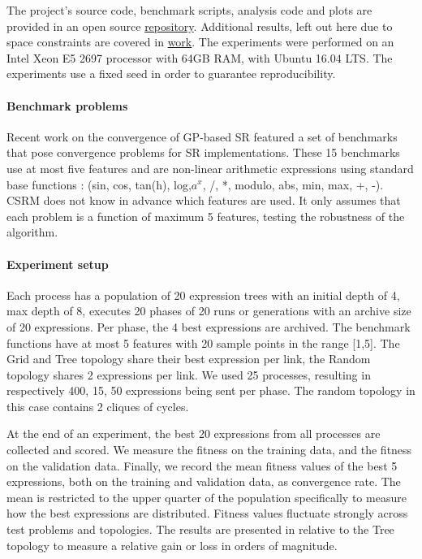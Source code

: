 
The project's source code, benchmark scripts, analysis code and plots are provided in an open source  \href{https://bitbucket.org/bcardoen/csrm}{repository}. Additional results, left out here due to space constraints are covered in \href{https://bitbucket.org/bcardoen/csrm/src/9de4b990ce27bbaeb885203f82a76635d8d92473/thesis/thesis/MsCThesisBenCardoen.pdf?at=master&fileviewer=file-view-default}{work}.
The experiments were performed on an Intel Xeon E5 2697 processor with 64GB RAM, with Ubuntu 16.04 LTS.  The experiments use a fixed seed in order to guarantee reproducibility. 
 
\paragraph{Benchmark problems}
Recent work on the convergence of GP-based SR \cite{SRAccur, SRBaseline} featured a set of benchmarks that pose convergence problems for SR implementations. 
These 15 benchmarks use at most five features and are non-linear arithmetic expressions using standard base functions : (sin, cos, tan(h), log,$a^x$, /, *, modulo, abs, min, max, +, -). CSRM does not know in advance which features are used. It only assumes that each problem is a function of maximum 5 features, testing the robustness of the algorithm.

\paragraph{Experiment setup}
Each process has a population of 20 expression trees with an initial depth of 4, max depth of 8, executes 20 phases of 20 runs or generations with an archive size of 20 expressions. Per phase, the 4 best expressions are archived. The benchmark functions have at most 5 features with 20 sample points in the range [1,5]. The Grid and Tree topology share their best expression per link, the Random topology shares 2 expressions per link. We used 25 processes, resulting in respectively 400, 15, 50 expressions being sent per phase. The random topology in this case contains 2 cliques of cycles.

At the end of an experiment, the best 20 expressions from all processes are collected and scored. We measure the fitness on the training data, and the fitness on the validation data. 
Finally, we record the mean fitness values of the best 5 expressions, both on the training and validation data, as convergence rate.
The mean is restricted to the upper quarter of the population specifically to measure how the best expressions are distributed. %
Fitness values fluctuate strongly across test problems and topologies. The results are presented in relative to the Tree topology to measure a relative gain or loss in orders of magnitude.


